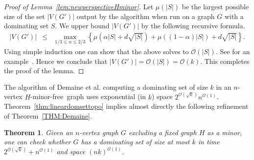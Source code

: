 \documentclass[11pt]{article}
\newtheorem{theorem}{Theorem}
\newcommand{\Hmf}{$H$-minor-free}
\newcommand{\cO}{\mathcal{O}}
\begin{document}
\begin{proof}[Proof of Lemma~\ref{lem:newperspectiveHminor}]
Let $\mu(|S|)$ be the largest possible
size of the set $|V(G')|$ output by the algorithm when run on a graph $G$ with a
dominating set $S$. We
upper bound $|V(G')|$ by the following recursive formula.
 \begin{eqnarray*}
|V(G')| & \leq & \max_{1/3 \leq \alpha \leq 2/3 }\left\{ \mu\left(\alpha |S|  + d \sqrt{|S|}\right) 
	    +  \mu\left( (1-\alpha)|S|  \right) 
	   +  d \sqrt {|S|}  \right\}.
\end{eqnarray*}
Using simple induction one can show that the above solves to $\cO(|S|)$. See for an example~\cite[Lemma~$2$]{FominLRS10}. Hence we conclude that $|V(G')|=\cO(|S|)=\cO(k)$. This completes the proof of the lemma. 
\end{proof}

The algorithm of Demaine et al. \cite{DemaineHaj05} computing a dominating set of size $k$ in an  $n$-vertex  \Hmf \, graph uses exponential (in $k$) space
$2^{\cO(\sqrt{k})} n^{\cO(1)}$. 
Theorem~\ref{thm:lineardomsettopo} implies almost directly the following refinement of Theorem~\ref{THM:Demaine}.
  \begin{theorem} 
 Given an $n$-vertex  graph $G$ excluding a fixed graph $H$ as a minor,  one  can check whether $G$ has a dominating set of size at most $k$ in time 
$2^{\cO(\sqrt{k})}+ n^{\cO(1)}$ and space $(nk)^{\cO(1)}$. 
\end{theorem}
\end{document}
